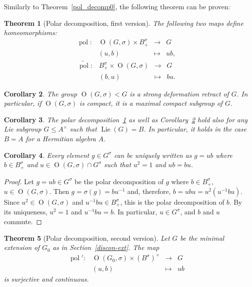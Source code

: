 \documentclass[a4paper,oneside,11pt]{amsart}
\DeclareMathOperator{\OO}{O}
\DeclareMathOperator{\Lie}{Lie}
\DeclareMathOperator{\pol}{pol}
\theoremstyle{plain}
\newtheorem{teo}{Theorem}[section]
\newtheorem{cor}[teo]{Corollary}
\theoremstyle{definition}
\theoremstyle{remark}
\begin{document}
Similarly to Theorem~\ref{pol_decomp0}, the following theorem can be proven:
\begin{teo}[Polar decomposition, first version]\label{pol_decomp1}
The following two maps define homeomorphisms:
$$\begin{matrix}
\pol\colon & \OO(G,\sigma)\times B^{\sigma}_+ & \to & G \\
& (u,b) & \mapsto & ub,
\end{matrix}$$
$$\begin{matrix}
\widetilde{\pol}\colon& B^{\sigma}_+ \times \OO(G,\sigma) & \to & G \\
&(b,u) & \mapsto & bu.
\end{matrix}$$
\end{teo}

\begin{cor}\label{Max_Comp_G}
The group $\OO(G,\sigma)<G$ is a strong deformation retract of $G$. In particular, if $\OO(G,\sigma)$ is compact, it is a maximal compact subgroup of $G$.
\end{cor}

\begin{cor}\label{pol_decomp_A}
The polar decomposition~\ref{pol_decomp1} as well as Corollary~\ref{Max_Comp_G} hold also for any Lie subgroup $G\leq A^\times$ such that $\Lie(G)=B$. In particular, it holds in the case $B=A$ for a Hermitian algebra $A$.
\end{cor}

\begin{cor}
    Every element $g\in G^\sigma$ can be uniquely written as $g=ub$ where $b\in B^\sigma_+$ and $u\in \OO(G,\sigma)\cap G^\sigma$ such that $u^2=1$ and $ub=bu$.
\end{cor}

\begin{proof}
    Let $g=ub\in G^\sigma$ be the polar decomposition of $g$ where $b\in B^\sigma_+$, $u\in \OO(G,\sigma)$. Then $g=\sigma(g)=bu^{-1}$ and, therefore, $b=ubu=u^2(u^{-1}bu)$. Since $u^2\in \OO(G,\sigma)$ and $u^{-1}bu\in B^\sigma_+$, this is the polar decomposition of $b$. By its uniqueness, $u^2=1$ and $u^{-1}bu=b$. In particular, $u\in G^\sigma$, and $b$ and $u$ commute.
\end{proof}

\begin{teo}[Polar decomposition, second version]
Let $G$ be the minimal extension of $G_0$ as in Section~\ref{discon-ext}. The map
$$\begin{matrix}
\pol'\colon & \OO(G_0,\sigma)\times (B^{\sigma})^\times & \to & G \\
& (u,b) & \mapsto & ub
\end{matrix}$$
is surjective and continuous.
\end{teo}
\end{document}

